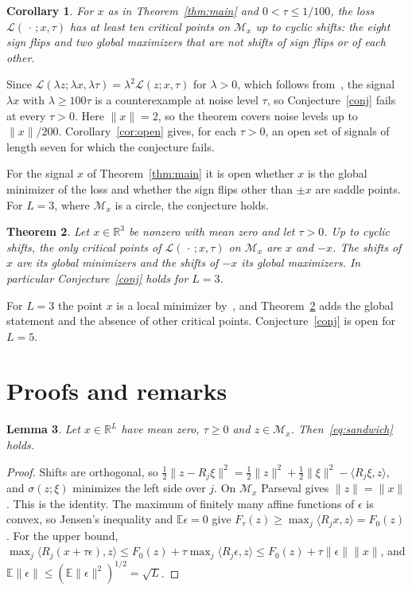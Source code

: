 \documentclass[11pt]{article}
\newtheorem{theorem}{Theorem}
\newtheorem{lemma}[theorem]{Lemma}
\newtheorem{corollary}[theorem]{Corollary}
\theoremstyle{remark}
\newcommand{\E}{\mathbb{E}}
\newcommand{\R}{\mathbb{R}}
\begin{document}
\begin{corollary}\label{cor:count}
For $x$ as in Theorem~\ref{thm:main} and $0<\tau\le1/100$, the loss $\mathcal L(\,\cdot\,;x,\tau)$ has at least ten critical points on $\mathcal M_x$ up to cyclic shifts: the eight sign flips and two global maximizers that are not shifts of sign flips or of each other.
\end{corollary}

Since $\mathcal L(\lambda z;\lambda x,\lambda\tau)=\lambda^2\mathcal L(z;x,\tau)$ for $\lambda>0$, which follows from~\cite[Lemma~2.10(i)]{SSA24}, the signal $\lambda x$ with $\lambda\ge100\tau$ is a counterexample at noise level $\tau$, so Conjecture~\ref{conj} fails at every $\tau>0$. Here $\|x\|=2$, so the theorem covers noise levels up to $\|x\|/200$. Corollary~\ref{cor:open} gives, for each $\tau>0$, an open set of signals of length seven for which the conjecture fails.

For the signal $x$ of Theorem~\ref{thm:main} it is open whether $x$ is the global minimizer of the loss and whether the sign flips other than $\pm x$ are saddle points. For $L=3$, where $\mathcal M_x$ is a circle, the conjecture holds.

\begin{theorem}\label{thm:three}
Let $x\in\R^3$ be nonzero with mean zero and let $\tau>0$. Up to cyclic shifts, the only critical points of $\mathcal L(\,\cdot\,;x,\tau)$ on $\mathcal M_x$ are $x$ and $-x$. The shifts of $x$ are its global minimizers and the shifts of $-x$ its global maximizers. In particular Conjecture~\ref{conj} holds for $L=3$.
\end{theorem}

For $L=3$ the point $x$ is a local minimizer by~\cite[Theorem~3.9]{SSA24}, and Theorem~\ref{thm:three} adds the global statement and the absence of other critical points. Conjecture~\ref{conj} is open for $L=5$.

\section{Proofs and remarks}\label{sec:proof}

\begin{lemma}\label{lem:score}
Let $x\in\R^L$ have mean zero, $\tau\ge0$ and $z\in\mathcal M_x$. Then~\eqref{eq:sandwich} holds.
\end{lemma}

\begin{proof}
Shifts are orthogonal, so $\tfrac12\|z-R_j\xi\|^2=\tfrac12\|z\|^2+\tfrac12\|\xi\|^2-\langle R_j\xi,z\rangle$, and $\sigma(z;\xi)$ minimizes the left side over $j$. On $\mathcal M_x$ Parseval gives $\|z\|=\|x\|$. This is the identity. The maximum of finitely many affine functions of $\epsilon$ is convex, so Jensen's inequality and $\E\epsilon=0$ give $F_\tau(z)\ge\max_j\langle R_jx,z\rangle=F_0(z)$. For the upper bound, $\max_j\langle R_j(x+\tau\epsilon),z\rangle\le F_0(z)+\tau\max_j\langle R_j\epsilon,z\rangle\le F_0(z)+\tau\|\epsilon\|\|x\|$, and $\E\|\epsilon\|\le(\E\|\epsilon\|^2)^{1/2}=\sqrt L$.
\end{proof}
\end{document}
